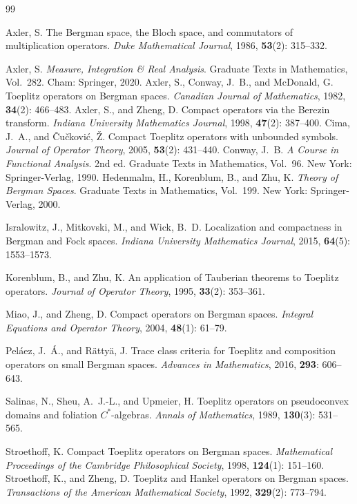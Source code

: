\documentclass[12pt,a4paper]{article}
\theoremstyle{remark}
\begin{document}
\begin{thebibliography}{99}

Axler, S.
The Bergman space, the Bloch space, and commutators of multiplication operators.
\emph{Duke Mathematical Journal},
1986, \textbf{53}(2): 315--332.

Axler, S.
\emph{Measure, Integration \& Real Analysis}.
Graduate Texts in Mathematics, Vol.~282.
Cham: Springer, 2020. 
Axler, S., Conway, J.~B., and McDonald, G.
Toeplitz operators on Bergman spaces.
\emph{Canadian Journal of Mathematics},
1982, \textbf{34}(2): 466--483.
Axler, S., and Zheng, D.
Compact operators via the Berezin transform.
\emph{Indiana University Mathematics Journal},
1998, \textbf{47}(2): 387--400.
Cima, J.~A., and \v{C}u\v{c}kovi\'c, \v{Z}.
Compact Toeplitz operators with unbounded symbols.
\emph{Journal of Operator Theory},
2005, \textbf{53}(2): 431--440.
Conway, J.~B.
\emph{A Course in Functional Analysis}. 2nd ed.
Graduate Texts in Mathematics, Vol.~96.
New York: Springer-Verlag, 1990.
Hedenmalm, H., Korenblum, B., and Zhu, K.
\emph{Theory of Bergman Spaces}.
Graduate Texts in Mathematics, Vol.~199.
New York: Springer-Verlag, 2000.

Isralowitz, J., Mitkovski, M., and Wick, B.~D.
Localization and compactness in Bergman and Fock spaces.
\emph{Indiana University Mathematics Journal},
2015, \textbf{64}(5): 1553--1573.

Korenblum, B., and Zhu, K.
An application of Tauberian theorems to Toeplitz operators.
\emph{Journal of Operator Theory},
1995, \textbf{33}(2): 353--361.

Miao, J., and Zheng, D.
Compact operators on Bergman spaces.
\emph{Integral Equations and Operator Theory},
2004, \textbf{48}(1): 61--79.

Pel\'aez, J.~\'A., and R\"atty\"a, J.
Trace class criteria for Toeplitz and composition operators on small Bergman spaces.
\emph{Advances in Mathematics},
2016, \textbf{293}: 606--643.

Salinas, N., Sheu, A.~J.-L., and Upmeier, H.
Toeplitz operators on pseudoconvex domains and foliation $C^*$-algebras.
\emph{Annals of Mathematics},
1989, \textbf{130}(3): 531--565.

Stroethoff, K.
Compact Toeplitz operators on Bergman spaces.
\emph{Mathematical Proceedings of the Cambridge Philosophical Society},
1998, \textbf{124}(1): 151--160.
Stroethoff, K., and Zheng, D.
Toeplitz and Hankel operators on Bergman spaces.
\emph{Transactions of the American Mathematical Society},
1992, \textbf{329}(2): 773--794.


\end{thebibliography}
\end{document}
